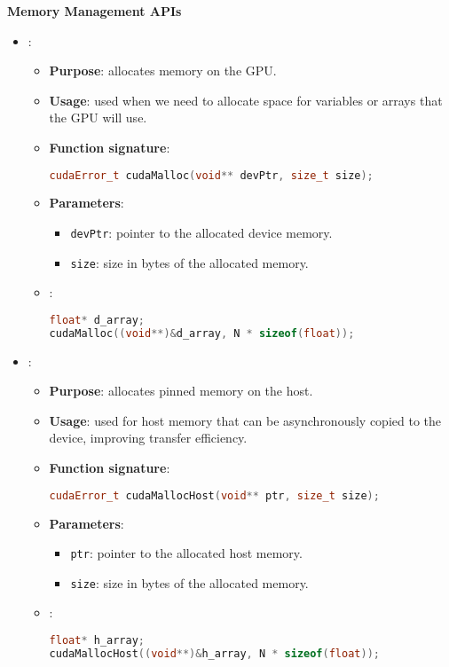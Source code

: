 \newpage

\begin{flushleft}
    \textcolor{Green3}{ \textbf{Memory Management APIs}}
\end{flushleft}
\begin{itemize}
    \item {}:
    \begin{itemize}
        \item \textbf{Purpose}: allocates memory on the GPU.
        \item \textbf{Usage}: used when we need to allocate space for variables or arrays that the GPU will use.
        \item \textbf{Function signature}:
        \begin{lstlisting}[language=C++]
cudaError_t cudaMalloc(void** devPtr, size_t size);\end{lstlisting}
        \item \textbf{Parameters}:
        \begin{itemize}
            \item \texttt{devPtr}: pointer to the allocated device memory.
            \item \texttt{size}: size in bytes of the allocated memory.
        \end{itemize}
        \item {}:
        \begin{lstlisting}[language=C++]
float* d_array;
cudaMalloc((void**)&d_array, N * sizeof(float));\end{lstlisting}
    \end{itemize}

    \item{}:
    \begin{itemize}
        \item \textbf{Purpose}: allocates pinned memory on the host.
        \item \textbf{Usage}: used for host memory that can be asynchronously copied to the device, improving transfer efficiency.
        \item \textbf{Function signature}:
        \begin{lstlisting}[language=C++]
cudaError_t cudaMallocHost(void** ptr, size_t size);\end{lstlisting}
        \item \textbf{Parameters}:
        \begin{itemize}
            \item \texttt{ptr}: pointer to the allocated host memory.
            \item \texttt{size}: size in bytes of the allocated memory.
        \end{itemize}
        \item {}:
        \begin{lstlisting}[language=C++]
float* h_array;
cudaMallocHost((void**)&h_array, N * sizeof(float));\end{lstlisting}
    \end{itemize}


\end{itemize}
